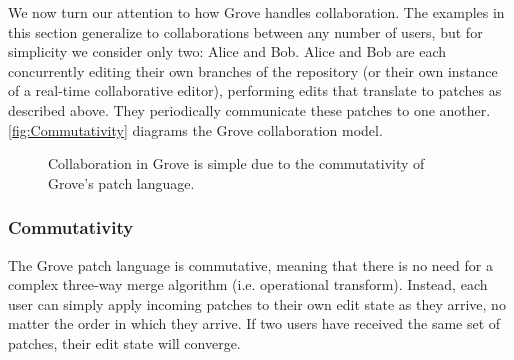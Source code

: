 We now turn our attention to how Grove handles collaboration.
The examples in this section generalize to collaborations between any number of users,
but for simplicity we consider only two: Alice and Bob.
Alice and Bob are each concurrently editing their own branches of the repository (or their own instance of a real-time collaborative editor), 
performing edits that translate to patches as described above. 
They periodically communicate these patches to one another. \autoref{fig:Commutativity} diagrams the Grove collaboration model.



\begin{figure}[h]
  \centering
  \caption{Collaboration in Grove is simple due to the commutativity of Grove's patch language.}
  \label{fig:Commutativity}
\end{figure}



\subsubsection{Commutativity}%
\figureDifferentPartsNestedParts

\label{sub:Commutativity:informal}
The Grove patch language is commutative, meaning that there is no need for a 
complex three-way merge algorithm (i.e. operational transform). Instead, each 
user can simply apply incoming patches to their own edit state as they arrive, no matter the order in 
which they arrive. If two users have received the same set of patches, their edit state will converge.

